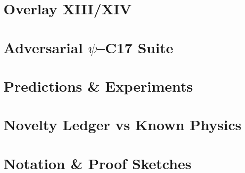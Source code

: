 \documentclass[11pt,oneside]{book}
\numberwithin{equation}{chapter}
\begin{document}
\chapter{Overlay XIII/XIV}


\chapter{Adversarial $\psi$--C17 Suite}


\chapter{Predictions \& Experiments}


\chapter{Novelty Ledger vs Known Physics}


\appendix
\chapter{Notation \& Proof Sketches}


\cleardoublepage


\end{document}
